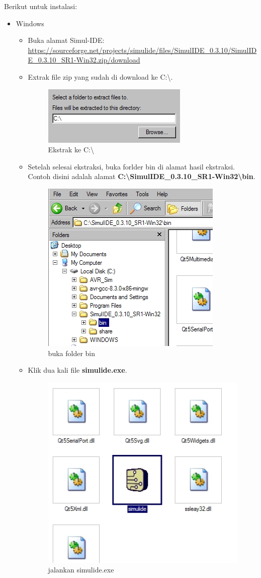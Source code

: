 \documentclass[12pt,]{article}
\begin{document}
	Berikut untuk instalasi:
	\begin{itemize}
		\item Windows
		\begin{itemize}
			\item Buka alamat Simul-IDE:\\
			\url{https://sourceforge.net/projects/simulide/files/SimulIDE_0.3.10/SimulIDE_0.3.10_SR1-Win32.zip/download}
			
			\item Extrak file zip yang sudah di download ke C:\textbackslash.
			\begin{figure}[H]
				\centering
				\includegraphics[width=0.35\linewidth]{images/simulide_0a}
				\caption{Ekstrak ke C:\textbackslash}
			\end{figure}
		
			\item Setelah selesai ekstraksi, buka forlder bin di alamat hasil ekstraksi.
			Contoh disini adalah alamat \textbf{C:\textbackslash SimulIDE\_0.3.10\_SR1-Win32\textbackslash bin}.

			\begin{figure}[H]
				\centering
				\includegraphics[width=0.35\linewidth]{images/simulide_0b}
				\caption{buka folder bin}
			\end{figure}
	
			\newpage
			\item Klik dua kali file \textbf{simulide.exe}.
			\begin{figure}[H]
				\centering
				\includegraphics[width=0.35\linewidth]{images/simulide_0c}
				\caption{jalankan simulide.exe}
			\end{figure}
		

\end{itemize}
\end{itemize}
\end{document}
